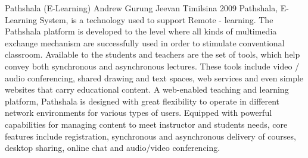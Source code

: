  \begin{conf-abstract}[]
{Pathshala (E-Learning) }
{
Andrew Gurung
Jeevan Timilsina
}
{2009 }
 Pathshala, E-Learning System, is a technology used to support Remote - learning. The Pathshala platform is developed to the level where all kinds of multimedia exchange mechanism are successfully used in order to stimulate conventional classroom. Available to the students and teachers are the set of tools, which help convey both synchronous and asynchronous lectures. These tools include video / audio conferencing, shared drawing and text spaces, web services and even simple websites that  carry educational content. A web-enabled  teaching and learning platform, Pathshala is designed with great flexibility to operate in different network environments for various types of users. Equipped with powerful capabilities for managing content to meet instructor and students needs, core features include registration, synchronous and asynchronous delivery of courses, desktop sharing, online chat and audio/video conferencing.  
  \end{conf-abstract}